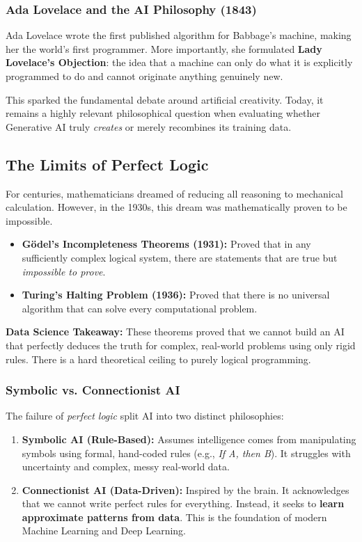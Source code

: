 \documentclass[11pt]{article}
\theoremstyle{smallexample}
\begin{document}
\subsubsection{Ada Lovelace and the AI Philosophy (1843)}
Ada Lovelace wrote the first published algorithm for Babbage's machine, making her the world's first programmer. More importantly, she formulated \textbf{Lady Lovelace's Objection}: the idea that a machine can only do what it is explicitly programmed to do and cannot originate anything genuinely new.


This sparked the fundamental debate around artificial creativity. Today, it remains a highly relevant philosophical question when evaluating whether Generative AI truly \textit{creates} or merely recombines its training data.




\subsection{The Limits of Perfect Logic}
For centuries, mathematicians dreamed of reducing all reasoning to mechanical calculation. However, in the 1930s, this dream was mathematically proven to be impossible.

\begin{itemize}
    \item \textbf{G\"odel's Incompleteness Theorems (1931):} Proved that in any sufficiently complex logical system, there are statements that are true but \textit{impossible to prove}.
    \item \textbf{Turing's Halting Problem (1936):} Proved that there is no universal algorithm that can solve every computational problem. 
\end{itemize}
\textbf{Data Science Takeaway:} These theorems proved that we cannot build an AI that perfectly deduces the truth for complex, real-world problems using only rigid rules. There is a hard theoretical ceiling to purely logical programming.

\subsubsection{Symbolic vs. Connectionist AI}
The failure of \textit{perfect logic} split AI into two distinct philosophies:

\begin{enumerate}
    \item \textbf{Symbolic AI (Rule-Based):} Assumes intelligence comes from manipulating symbols using formal, hand-coded rules (e.g., \textit{If A, then B}). It struggles with uncertainty and complex, messy real-world data.
    \item \textbf{Connectionist AI (Data-Driven):} Inspired by the brain. It acknowledges that we cannot write perfect rules for everything. Instead, it seeks to \textbf{learn approximate patterns from data}. This is the foundation of modern Machine Learning and Deep Learning.
\end{enumerate}
\end{document}
